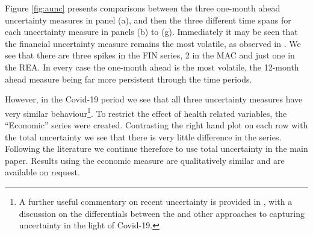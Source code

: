 \documentclass{article}
\begin{document}
Figure \ref{fig:aunc} presents comparisons between the three one-month ahead uncertainty measures in panel (a), and then the three different time spans for each uncertainty measure in panels (b) to (g). Immediately it may be seen that the financial uncertainty measure remains the most volatile, as observed in \cite{jurado2015measuring}. We see that there are three spikes in the FIN series, 2 in the MAC and just one in the REA. In every case the one-month ahead is the most volatile, the 12-month ahead measure being far more persistent through the time periods.

However, in the Covid-19 period we see that all three uncertainty measures have very similar behaviour\footnote{A further useful commentary on recent uncertainty is provided in \cite{altig2020economic}, with a discussion on the differentials between the \cite{jurado2015measuring} and other approaches to capturing uncertainty in the light of Covid-19.}. To restrict the effect of health related variables, the ``Economic'' series were created. Contrasting the right hand plot on each row with the total uncertainty we see that there is very little difference in the series. Following the literature we continue therefore to use total uncertainty in the main paper. Results using the economic measure are qualitatively similar and are available on request.
\end{document}
